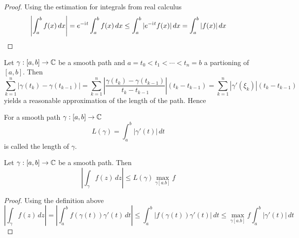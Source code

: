 \begin{proof} Using the estimation for integrals from real calculus
	\[
		\left|\int_a^b f(x)\,dx \right|  = e^{-\mathrm{i}\mkern1mu t}\int_a^b f(x)\,dx \le \int_a^b |e^{-\mathrm{i}\mkern1mu t}f(x)|\,dx
		= \int_a^b |f(x)|\,dx
	\]
\end{proof}
\bigskip


Let \( \gamma: [a,b] \to \mathbb{C} \) be a smooth path and \( a = t_0 < t_1 < \cdots < t_n = b \)
a partioning of \( [a,b] \). Then
\[
	\sum_{k = 1}^n |\gamma(t_k) - \gamma(t_{k - 1})|
	= \sum_{k = 1}^n \left| \frac{\gamma(t_k) - \gamma(t_{k - 1})}{t_k - t_{k - 1}} \right| (t_k - t_{k - 1})
	= \sum_{k = 1}^n | \gamma'(\xi_k)| (t_k - t_{k - 1})
\]
yields a reasonable approximation of the length of the path. Hence
\bigskip


\begin{definition}
	For a smooth path \( \gamma: [a,b] \to \mathbb{C} \)
	\[
		L(\gamma) = \int_a^b |\gamma'(t)|\,dt
	\]
	is called the length of \( \gamma \).
\end{definition}
\bigskip


\begin{lemma}
	Let \( \gamma: [a,b] \to \mathbb{C} \) be a smooth path. Then
	\[
		\left| \int_{\gamma} f(z)\,dz \right| \le L(\gamma) \max_{\gamma[a.b]} f
	\]
\end{lemma}

\begin{proof} Using the definition above
	\[
		\left| \int_{\gamma} f(z)\,dz \right|
		= \left| \int_a^b f(\gamma(t))\gamma'(t)\,dt \right|
		\le \int_a^b |f(\gamma(t))\gamma'(t)|\,dt
		\le  \max_{\gamma[a.b]}f \int_a^b |\gamma'(t)|\,dt
	\]
\end{proof}
\bigskip


